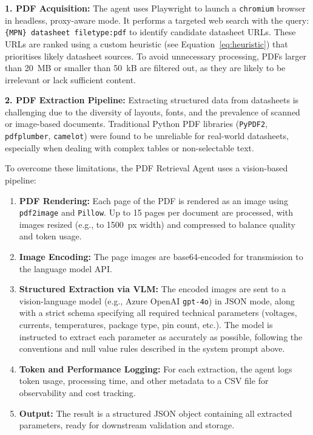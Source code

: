 \textbf{1. PDF Acquisition:} The agent uses Playwright to launch a \texttt{chromium} browser in headless, proxy-aware mode. It performs a targeted web search with the query:
\texttt{\{MPN\} datasheet filetype:pdf}
to identify candidate datasheet URLs. These URLs are ranked using a custom heuristic (see Equation~\ref{eq:heuristic}) that prioritises likely datasheet sources. To avoid unnecessary processing, PDFs larger than 20~MB or smaller than 50~kB are filtered out, as they are likely to be irrelevant or lack sufficient content.

\textbf{2. PDF Extraction Pipeline:}
Extracting structured data from datasheets is challenging due to the diversity of layouts, fonts, and the prevalence of scanned or image-based documents. Traditional Python PDF libraries (\texttt{PyPDF2}, \texttt{pdfplumber}, \texttt{camelot}) were found to be unreliable for real-world datasheets, especially when dealing with complex tables or non-selectable text.

To overcome these limitations, the PDF Retrieval Agent uses a vision-based pipeline:
\begin{enumerate}
    \item \textbf{PDF Rendering:} Each page of the PDF is rendered as an image using \texttt{pdf2image} and \texttt{Pillow}. Up to 15 pages per document are processed, with images resized (e.g., to 1500~px width) and compressed to balance quality and token usage.
    \item \textbf{Image Encoding:} The page images are base64-encoded for transmission to the language model API.
    \item \textbf{Structured Extraction via VLM:} The encoded images are sent to a vision-language model (e.g., Azure OpenAI \texttt{gpt-4o}) in JSON mode, along with a strict schema specifying all required technical parameters (voltages, currents, temperatures, package type, pin count, etc.). The model is instructed to extract each parameter as accurately as possible, following the conventions and null value rules described in the system prompt above.
    \item \textbf{Token and Performance Logging:} For each extraction, the agent logs token usage, processing time, and other metadata to a CSV file for observability and cost tracking.
    \item \textbf{Output:} The result is a structured JSON object containing all extracted parameters, ready for downstream validation and storage.
\end{enumerate}

